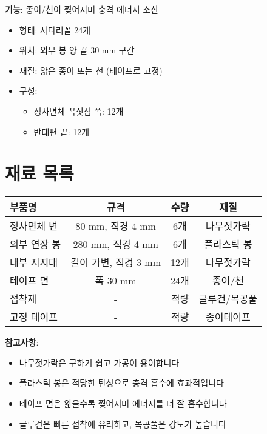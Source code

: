 \documentclass[a4paper,12pt]{article}
\begin{document}
\begin{CJK}{UTF8}{mj}
\textbf{기능}: 종이/천이 찢어지며 충격 에너지 소산

\begin{itemize}
    \item 형태: 사다리꼴 24개
    \item 위치: 외부 봉 양 끝 30 mm 구간
    \item 재질: 얇은 종이 또는 천 (테이프로 고정)
    \item 구성: 
    \begin{itemize}
        \item 정사면체 꼭짓점 쪽: 12개
        \item 반대편 끝: 12개
    \end{itemize}
\end{itemize}

\section{재료 목록}

\begin{center}
\begin{tabular}{lccc}
\toprule
\textbf{부품명} & \textbf{규격} & \textbf{수량} & \textbf{재질} \\
\midrule
정사면체 변 & 80 mm, 직경 4 mm & 6개 & 나무젓가락 \\
외부 연장 봉 & 280 mm, 직경 4 mm & 6개 & 플라스틱 봉 \\
내부 지지대 & 길이 가변, 직경 3 mm & 12개 & 나무젓가락 \\
테이프 면 & 폭 30 mm & 24개 & 종이/천 \\
접착제 & - & 적량 & 글루건/목공풀 \\
고정 테이프 & - & 적량 & 종이테이프 \\
\bottomrule
\end{tabular}
\end{center}

\vspace{0.5cm}

\textbf{참고사항}:
\begin{itemize}
    \item 나무젓가락은 구하기 쉽고 가공이 용이합니다
    \item 플라스틱 봉은 적당한 탄성으로 충격 흡수에 효과적입니다
    \item 테이프 면은 얇을수록 찢어지며 에너지를 더 잘 흡수합니다
    \item 글루건은 빠른 접착에 유리하고, 목공풀은 강도가 높습니다
\end{itemize}


\end{CJK}
\end{document}

